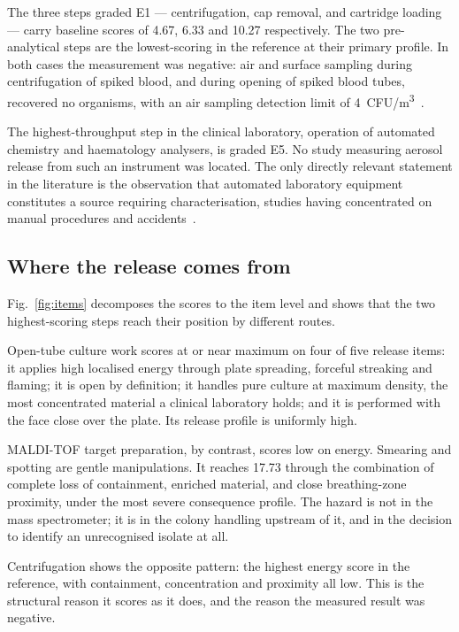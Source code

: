 The three steps graded E1 --- centrifugation, cap removal, and cartridge loading --- carry
baseline scores of 4.67, 6.33 and 10.27 respectively. The two pre-analytical steps are the
lowest-scoring in the reference at their primary profile. In both cases the measurement
was negative: air and surface sampling during centrifugation of spiked blood, and during
opening of spiked blood tubes, recovered no organisms, with an air sampling detection
limit of 4~CFU/m\textsuperscript{3}~\cite{dubuis2021}.

The highest-throughput step in the clinical laboratory, operation of automated chemistry
and haematology analysers, is graded E5. No study measuring aerosol release from such an
instrument was located. The only directly relevant statement in the literature is the
observation that automated laboratory equipment constitutes a source requiring
characterisation, studies having concentrated on manual procedures and
accidents~\cite{ravnholdt2025}.

\subsection{Where the release comes from}

Fig.~\ref{fig:items} decomposes the scores to the item level and shows that the two
highest-scoring steps reach their position by different routes.

Open-tube culture work scores at or near maximum on four of five release items: it applies
high localised energy through plate spreading, forceful streaking and flaming; it is open
by definition; it handles pure culture at maximum density, the most concentrated material
a clinical laboratory holds; and it is performed with the face close over the plate. Its
release profile is uniformly high.

MALDI-TOF target preparation, by contrast, scores low on energy. Smearing and spotting are
gentle manipulations. It reaches 17.73 through the combination of complete loss of
containment, enriched material, and close breathing-zone proximity, under the most severe
consequence profile. The hazard is not in the mass spectrometer; it is in the colony
handling upstream of it, and in the decision to identify an unrecognised isolate at all.

Centrifugation shows the opposite pattern: the highest energy score in the reference, with
containment, concentration and proximity all low. This is the structural reason it scores
as it does, and the reason the measured result was negative.

